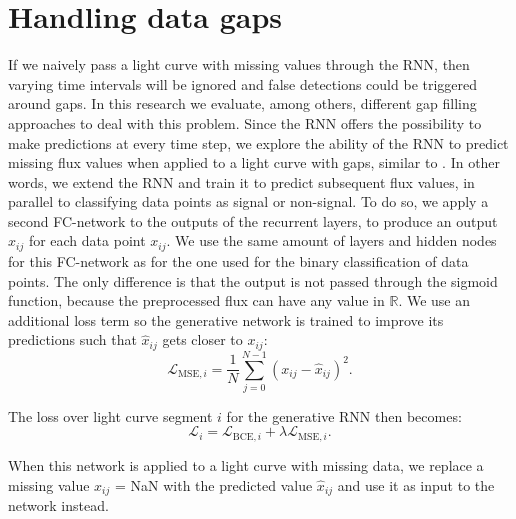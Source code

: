 
\section{Handling data gaps}
\label{sec:rnn_gen}

If we naively pass a light curve with missing values through the RNN, then varying time intervals will be ignored and false detections could be triggered around gaps. In this research we evaluate, among others, different gap filling approaches to deal with this problem. Since the RNN offers the possibility to make predictions at every time step, we explore the ability of the RNN to predict missing flux values when applied to a light curve with gaps, similar to \cite{morvan2020detrending}. In other words, we extend the RNN and train it to predict subsequent flux values, in parallel to classifying data points as signal or non-signal. To do so, we apply a second FC-network to the outputs of the recurrent layers, to produce an output $\hat{x}_{ij}$ for each data point $x_{ij}$. We use the same amount of layers and hidden nodes for this FC-network as for the one used for the binary classification of data points. The only difference is that the output is not passed through the sigmoid function, because the preprocessed flux can have any value in $\mathbb{R}$. We use an additional loss term so the generative network is trained to improve its predictions such that $\hat{x}_{ij}$ gets closer to $x_{ij}$:
\begin{equation}
    \mathcal{L}_{\text{MSE},i} = \frac{1}{N}\sum^{N-1}_{j=0} (x_{ij} - \hat{x}_{ij})^2.
\end{equation}

\noindent The loss over light curve segment $i$ for the generative RNN then becomes:
\begin{equation}
    \mathcal{L}_i = \mathcal{L}_{\text{BCE},i} + \lambda \mathcal{L}_{\text{MSE},i}.
\end{equation}

\noindent When this network is applied to a light curve with missing data, we replace a missing value $x_{ij}$ = NaN with the predicted value $\hat{x}_{ij}$ and use it as input to the network instead.